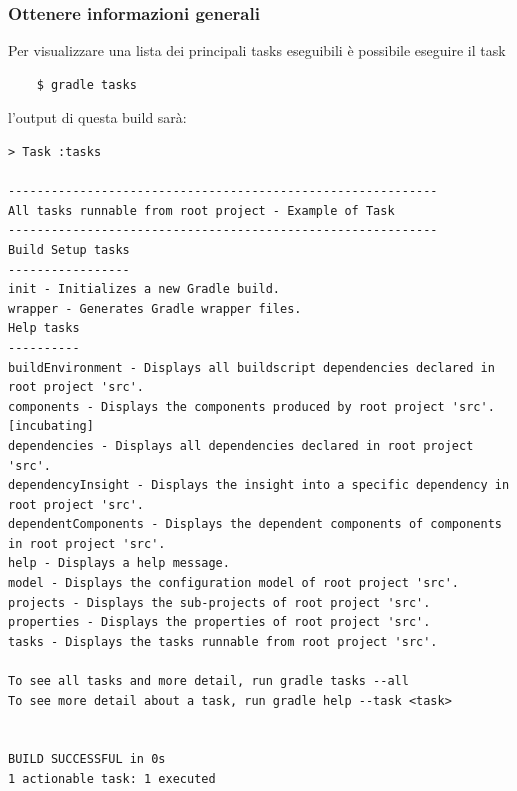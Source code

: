 \subsubsection{Ottenere informazioni generali} 
Per visualizzare una lista dei principali tasks eseguibili è possibile eseguire il task \begin{verbatim}    $ gradle tasks\end{verbatim} l'output di questa build sarà:
\begin{verbatim}
> Task :tasks 

------------------------------------------------------------
All tasks runnable from root project - Example of Task
------------------------------------------------------------
Build Setup tasks
-----------------
init - Initializes a new Gradle build.
wrapper - Generates Gradle wrapper files.
Help tasks
----------
buildEnvironment - Displays all buildscript dependencies declared in root project 'src'.
components - Displays the components produced by root project 'src'. [incubating]
dependencies - Displays all dependencies declared in root project 'src'.
dependencyInsight - Displays the insight into a specific dependency in root project 'src'.
dependentComponents - Displays the dependent components of components in root project 'src'. 
help - Displays a help message.
model - Displays the configuration model of root project 'src'.
projects - Displays the sub-projects of root project 'src'.
properties - Displays the properties of root project 'src'.
tasks - Displays the tasks runnable from root project 'src'.

To see all tasks and more detail, run gradle tasks --all
To see more detail about a task, run gradle help --task <task>


BUILD SUCCESSFUL in 0s
1 actionable task: 1 executed
\end{verbatim}

